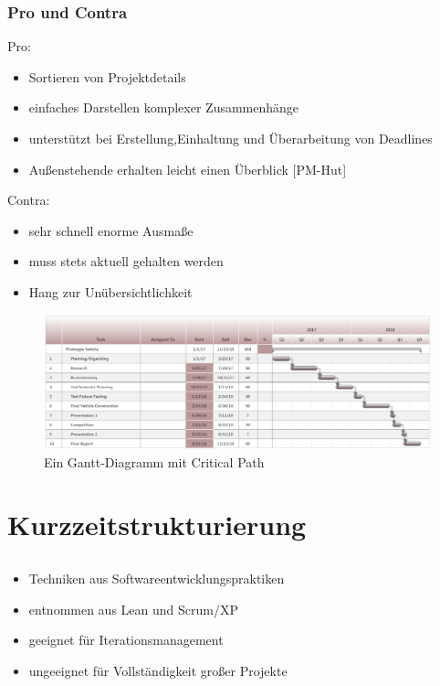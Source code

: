 \documentclass[%
	handout
]{beamer}
\newcommand{\pmhut}{[PM-Hut]}
\begin{document}
		\begin{frame}
			\frametitle{Pro und Contra}
			\begin{minipage}[t]{.48\textwidth}
				Pro:
				\begin{itemize}
					\item Sortieren von Projektdetails
					\item einfaches Darstellen komplexer Zusammenhänge
					\item unterstützt bei Erstellung,Einhaltung und Überarbeitung von Deadlines
					\item Außenstehende erhalten leicht einen Überblick \pmhut
				\end{itemize}
			\end{minipage}
			\begin{minipage}[t]{.48\textwidth}
				Contra:
				\begin{itemize}
					\item sehr schnell enorme Ausmaße
					\item muss stets aktuell gehalten werden
					\item Hang zur Unübersichtlichkeit
				\end{itemize}
			\end{minipage}
		\end{frame}
		
		\begin{frame}
			\begin{figure}
				\begin{center}
					\includegraphics[scale=.1]{../images/gantt2.png}
					\caption{Ein Gantt-Diagramm mit Critical Path}
					\label{img:gantt}
				\end{center}
			\end{figure}
		\end{frame}
		
\section{Kurzzeitstrukturierung}
	\subsection{}
		\begin{frame}
			\begin{itemize}
				\item Techniken aus Softwareentwicklungspraktiken
				\item entnommen aus Lean und Scrum/XP
				\item geeignet für Iterationsmanagement
				\item ungeeignet für Vollständigkeit großer Projekte
			\end{itemize}
		\end{frame}
\end{document}
